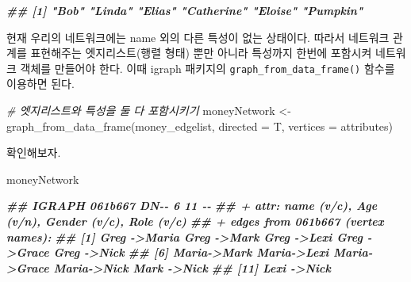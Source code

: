 \documentclass[
]{book}
\newenvironment{Shaded}{\begin{snugshade}}{\end{snugshade}}
\newcommand{\AttributeTok}[1]{\textcolor[rgb]{0.77,0.63,0.00}{#1}}
\newcommand{\CommentTok}[1]{\textcolor[rgb]{0.56,0.35,0.01}{\textit{#1}}}
\newcommand{\DocumentationTok}[1]{\textcolor[rgb]{0.56,0.35,0.01}{\textbf{\textit{#1}}}}
\newcommand{\FunctionTok}[1]{\textcolor[rgb]{0.00,0.00,0.00}{#1}}
\newcommand{\NormalTok}[1]{#1}
\newcommand{\OtherTok}[1]{\textcolor[rgb]{0.56,0.35,0.01}{#1}}
\newcommand{\SpecialCharTok}[1]{\textcolor[rgb]{0.00,0.00,0.00}{#1}}
\newcommand{\StringTok}[1]{\textcolor[rgb]{0.31,0.60,0.02}{#1}}
\begin{document}
\begin{Shaded}
\end{Shaded}

\begin{Shaded}
\begin{Highlighting}[]
\DocumentationTok{\#\# [1] "Bob"       "Linda"     "Elias"     "Catherine" "Eloise"    "Pumpkin"}
\end{Highlighting}
\end{Shaded}

현재 우리의 네트워크에는 name 외의 다른 특성이 없는 상태이다. 따라서 네트워크 관계를 표현해주는 엣지리스트(행렬 형태) 뿐만 아니라 특성까지 한번에 포함시켜 네트워크 객체를 만들어야 한다. 이때 igraph 패키지의 \texttt{graph\_from\_data\_frame()} 함수를 이용하면 된다.

\begin{Shaded}
\begin{Highlighting}[]
\CommentTok{\# 엣지리스트와 특성을 둘 다 포함시키기 }
\NormalTok{moneyNetwork }\OtherTok{\textless{}{-}} \FunctionTok{graph\_from\_data\_frame}\NormalTok{(money\_edgelist, }\AttributeTok{directed =}\NormalTok{ T, }\AttributeTok{vertices =}\NormalTok{ attributes)}
\end{Highlighting}
\end{Shaded}

확인해보자.

\begin{Shaded}
\begin{Highlighting}[]
\NormalTok{moneyNetwork}
\end{Highlighting}
\end{Shaded}

\begin{Shaded}
\begin{Highlighting}[]
\DocumentationTok{\#\# IGRAPH 061b667 DN{-}{-} 6 11 {-}{-} }
\DocumentationTok{\#\# + attr: name (v/c), Age (v/n), Gender (v/c), Role (v/c)}
\DocumentationTok{\#\# + edges from 061b667 (vertex names):}
\DocumentationTok{\#\#  [1] Greg {-}\textgreater{}Maria Greg {-}\textgreater{}Mark  Greg {-}\textgreater{}Lexi  Greg {-}\textgreater{}Grace Greg {-}\textgreater{}Nick }
\DocumentationTok{\#\#  [6] Maria{-}\textgreater{}Mark  Maria{-}\textgreater{}Lexi  Maria{-}\textgreater{}Grace Maria{-}\textgreater{}Nick  Mark {-}\textgreater{}Nick }
\DocumentationTok{\#\# [11] Lexi {-}\textgreater{}Nick}
\end{Highlighting}
\end{Shaded}
\end{document}
